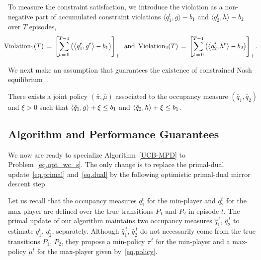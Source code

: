 \documentclass[12pt, final]{l4dc2023}
\begin{document}
To measure the constraint satisfaction, we introduce the violation as a non-negative part of accumulated constraint violations $\langle{q_1^t},{g}\rangle-b_1$ and $\langle{q_2^t},{h}\rangle - b_2$ over $T$ episodes,
\begin{equation}\label{eq.violation_s}
\!\!\!\!
\text{Violation}_1(T) \,=\, \left[\sum_{t\,=\,0}^{T-1} \left(\left\langle q_1^t,g^t \right\rangle-b_1\right)\right]_+
\, \text{ and } \,
\text{Violation}_2(T) \,=\, \left[\sum_{t\,=\,0}^{T-1} \left(\left\langle q_2^t,h^t \right\rangle-b_2\right)\right]_+.
\end{equation}

We next make an assumption that guarantees the existence of constrained Nash equilibrium~\citep{altman2000constrained}.

\begin{assumption}[Feasibility]\label{as.feasibility_s}
	There exists a joint policy $(\bar \pi,\bar\mu)$ associated to the occupancy measure $(\bar q_1,\bar q_2)$ and $\xi>0$ such that $\left\langle \bar q_1,g \right\rangle+\xi\leq b_1$ and $\left\langle \bar q_2,h \right\rangle+\xi\leq b_1$.
\end{assumption}

\subsection{Algorithm and Performance Guarantees}
We now are ready to specialize Algorithm~\ref{UCB-MPD} to Problem~\eqref{eq.opt_wc_s}. The only change is to replace the primal-dual update~\eqref{eq.primal} and~\eqref{eq.dual} by the following optimistic primal-dual mirror descent step. 

Let us recall that the occupancy measures $q_1^t$ for the min-player and $q_2^t$ for the max-player are defined over the true transitions $P_1$ and $P_2$ in episode $t$. The primal update of our algorithm maintains two occupancy measures $\hat q_1^{\,t}$, $\hat q_2^{\,t}$ to estimate $q_1^t$, $q_2^t$, separately. Although $\hat q_1^{\,t}$, $\hat q_2^{\,t}$ do not necessarily come from the true transitions $P_1$, $P_2$, they propose a min-policy $\pi^t$ for the min-player and a max-policy $\mu^t$ for the max-player given by~\eqref{eq.policy}.
\end{document}
